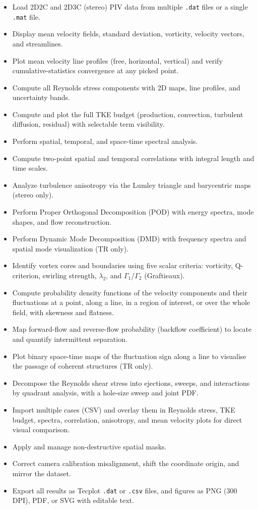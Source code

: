 \documentclass[11pt, a4paper]{report}
\begin{document}
\begin{itemize}[leftmargin=1.5em]
  \item Load 2D2C and 2D3C (stereo) PIV data from multiple \texttt{.dat} files or a single \texttt{.mat} file.
  \item Display mean velocity fields, standard deviation, vorticity, velocity vectors, and streamlines.
  \item Plot mean velocity line profiles (free, horizontal, vertical) and verify cumulative-statistics convergence at any picked point.
  \item Compute all Reynolds stress components with 2D maps, line profiles, and uncertainty bands.
  \item Compute and plot the full TKE budget (production, convection, turbulent diffusion, residual) with selectable term visibility.
  \item Perform spatial, temporal, and space-time spectral analysis.
  \item Compute two-point spatial and temporal correlations with integral length and time scales.
  \item Analyze turbulence anisotropy via the Lumley triangle and barycentric maps (stereo only).
  \item Perform Proper Orthogonal Decomposition (POD) with energy spectra, mode shapes, and flow reconstruction.
  \item Perform Dynamic Mode Decomposition (DMD) with frequency spectra and spatial mode visualization (TR only).
  \item Identify vortex cores and boundaries using five scalar criteria: vorticity, Q-criterion, swirling strength, $\lambda_2$, and $\Gamma_1$/$\Gamma_2$ (Graftieaux).
  \item Compute probability density functions of the velocity components and their fluctuations at a point, along a line, in a region of interest, or over the whole field, with skewness and flatness.
  \item Map forward-flow and reverse-flow probability (backflow coefficient) to locate and quantify intermittent separation.
  \item Plot binary space-time maps of the fluctuation sign along a line to visualise the passage of coherent structures (TR only).
  \item Decompose the Reynolds shear stress into ejections, sweeps, and interactions by quadrant analysis, with a hole-size sweep and joint PDF.
  \item Import multiple cases (CSV) and overlay them in Reynolds stress, TKE budget, spectra, correlation, anisotropy, and mean velocity plots for direct visual comparison.
  \item Apply and manage non-destructive spatial masks.
  \item Correct camera calibration misalignment, shift the coordinate origin, and mirror the dataset.
  \item Export all results as Tecplot \texttt{.dat} or \texttt{.csv} files, and figures as PNG (300 DPI), PDF, or SVG with editable text.
\end{itemize}
\end{document}

